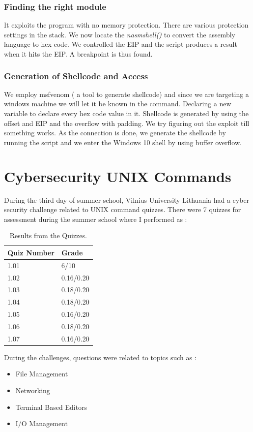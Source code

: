 \documentclass[runningheads]{llncs}
\begin{document}
\subsubsection{Finding the right module}
It exploits the program with no memory protection. There are various protection settings in the stack. 
We now locate the \textit{nasmshell()} to convert the assembly language to hex code. We controlled the EIP and the script produces a result
when it hits the EIP. A breakpoint is thus found.

\subsubsection{Generation of Shellcode and Access}
We employ msfvenom ( a tool to generate shellcode) and since we are targeting a windows machine we will let it be known in the command. 
Declaring a new variable to declare every hex code value in it. Shellcode is generated by using the offset and EIP and the overflow with padding.
We try figuring out the exploit till something works. As the connection is done, we generate the shellcode by running the script and we enter the Windows 10 shell by 
using buffer overflow.

\section{Cybersecurity UNIX Commands}
During the third day of summer school, Vilnius University Lithuania had a cyber security challenge related to UNIX command quizzes.
There were 7 quizzes for assessment during the summer school where I performed as :

\begin{table}
    \caption{Results from the Quizzes.}\label{tab2}
    \centering
    \begin{tabular}{|l|l|}
    \hline
    Quiz Number &  Grade \\
    \hline
    1.01 & 6/10 \\
    1.02 & 0.16/0.20 \\
    1.03 & 0.18/0.20 \\
    1.04 & 0.18/0.20 \\
    1.05 & 0.16/0.20 \\
    1.06 & 0.18/0.20 \\
    1.07 & 0.16/0.20 \\
    \hline
    \end{tabular}
\end{table}
During the challenges, questions were related to topics such as :
\begin{itemize}
    \item File Management
    \item Networking 
    \item Terminal Based Editors
    \item I/O Management
\end{itemize}
\end{document}
